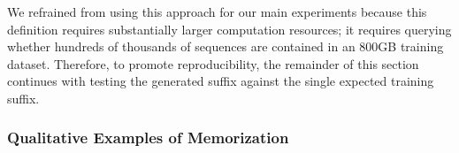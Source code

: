 We refrained from using this approach for our main experiments
%
%
because this definition requires substantially larger computation resources; it requires
querying whether hundreds of thousands of sequences are contained in an 800GB
training dataset.
%
Therefore, to promote reproducibility, the remainder of this section continues with testing the generated suffix against the single expected training suffix.
%

\subsubsection{Qualitative Examples of Memorization}

